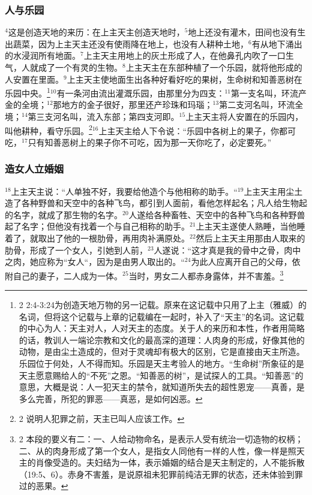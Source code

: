 \subsubsection{人与乐园}
$^{4}$这是创造天地的来历：在上主天主创造天地时，$^{5}$地上还没有灌木，田间也没有生出蔬菜，因为上主天主还没有使雨降在地上，也没有人耕种土地，$^{6}$有从地下涌出的水浸润所有地面。$^{7}$上主天主用地上的灰土形成了人，在他鼻孔内吹了一口生气，人就成了一个有灵的生物。$^{8}$上主天主在\UL[伊甸]东部种植了一个乐园，就将他形成的人安置在里面。$^{9}$上主天主使地面生出各种好看好吃的果树，生命树和知善恶树在乐园中央。\footnote{2 2:4-3:24为创造天地万物的另一记载。原来在这记载中只用了上主（雅威）的名词，但将这个记载与上章的记载编在一起时，补入了“天主”的名词。这记载的中心为人：天主对人，人对天主的态度。关于人的来历和本性，作者用简略的话，教训人一端论宗教和文化的最高深的道理：人肉身的形成，好像其他的动物，是由尘土造成的，但对于灵魂却有极大的区别，它是直接由天主所造。\UL[伊甸]乐园位于何处，人不得而知。乐园是天主考验人的地方。“生命树”所象征的是天主愿意赐给人的“不死”之恩。“知善恶的树”，是试探人的工具。“知善恶”的意思，大概是说：人一犯天主的禁令，就知道所失去的超性恩宠——真善，是多么完善，所犯的罪恶——真恶，是如何凶恶。}$^{10}$有一条河由\UL[伊甸]流出灌溉乐园，由那里分为四支：$^{11}$第一支名叫\UL[丕雄]，环流产金的\UL[哈威拉]全境；$^{12}$那地方的金子很好，那里还产珍珠和玛瑙；$^{13}$第二支河名叫\UL[基红]，环流\UL[雇士]全境；$^{14}$第三支河名叫\UL[底格里斯]，流入\UL[亚述]东部；第四支河即\UL[幼发拉的]。$^{15}$上主天主将人安置在\UL[伊甸]的乐园内，叫他耕种，看守乐园。\footnote{2 说明人犯罪之前，天主已叫人应该工作。}$^{16}$上主天主给人下令说：“乐园中各树上的果子，你都可吃，$^{17}$只有知善恶树上的果子你不可吃，因为那一天你吃了，必定要死。”


\subsubsection{造女人立婚姻}
$^{18}$上主天主说：“人单独不好，我要给他造个与他相称的助手。“$^{19}$上主天主用尘土造了各种野兽和天空中的各种飞鸟，都引到人面前，看他怎样起名；凡人给生物起的名字，就成了那生物的名字。$^{20}$人遂给各种畜牲、天空中的各种飞鸟和各种野兽起了名字；但他没有找着一个与自己相称的助手。$^{21}$上主天主遂使人熟睡，当他睡着了，就取出了他的一根肋骨，再用肉补满原处。$^{22}$然后上主天主用那由人取来的肋骨，形成了一个女人，引她到人前，$^{23}$人遂说：“这才真是我的骨中之骨，肉中之肉，她应称为“女人“，因为是由男人取出的。“$^{24}$为此人应离开自己的父母，依附自己的妻子，二人成为一体。$^{25}$当时，男女二人都赤身露体，并不害羞。\footnote{2 本段的要义有二：一、人给动物命名，是表示人受有统治一切造物的权柄；二、从\UL[亚当]的肉身形成了第一个女人，是指女人同他有一样的人性，像\UL[亚当]一样是照天主的肖像受造的。夫妇结为一体，表示婚姻的结合是天主制定的，人不能拆散（19:5、6）。赤身不害羞，是说原祖未犯罪前纯洁无罪的状态，还未体验到罪过的恶果。}


